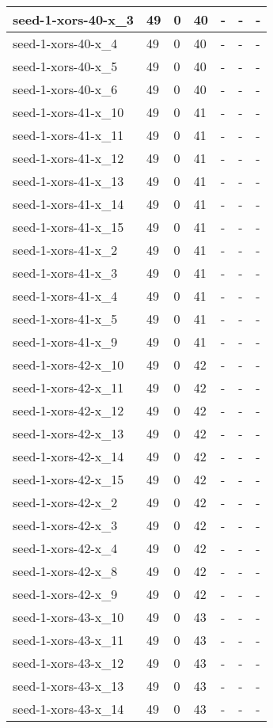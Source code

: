 \begin{scriptsize}
\begin{longtable}{|p{5cm}|l|l|l|l|l|l|}
seed-1-xors-40-x\_3&49&0&40&-&-&- \\ \hline 
seed-1-xors-40-x\_4&49&0&40&-&-&- \\ \hline 
seed-1-xors-40-x\_5&49&0&40&-&-&- \\ \hline 
seed-1-xors-40-x\_6&49&0&40&-&-&- \\ \hline 
seed-1-xors-41-x\_10&49&0&41&-&-&- \\ \hline 
seed-1-xors-41-x\_11&49&0&41&-&-&- \\ \hline 
seed-1-xors-41-x\_12&49&0&41&-&-&- \\ \hline 
seed-1-xors-41-x\_13&49&0&41&-&-&- \\ \hline 
seed-1-xors-41-x\_14&49&0&41&-&-&- \\ \hline 
seed-1-xors-41-x\_15&49&0&41&-&-&- \\ \hline 
seed-1-xors-41-x\_2&49&0&41&-&-&- \\ \hline 
seed-1-xors-41-x\_3&49&0&41&-&-&- \\ \hline 
seed-1-xors-41-x\_4&49&0&41&-&-&- \\ \hline 
seed-1-xors-41-x\_5&49&0&41&-&-&- \\ \hline 
seed-1-xors-41-x\_9&49&0&41&-&-&- \\ \hline 
seed-1-xors-42-x\_10&49&0&42&-&-&- \\ \hline 
seed-1-xors-42-x\_11&49&0&42&-&-&- \\ \hline 
seed-1-xors-42-x\_12&49&0&42&-&-&- \\ \hline 
seed-1-xors-42-x\_13&49&0&42&-&-&- \\ \hline 
seed-1-xors-42-x\_14&49&0&42&-&-&- \\ \hline 
seed-1-xors-42-x\_15&49&0&42&-&-&- \\ \hline 
seed-1-xors-42-x\_2&49&0&42&-&-&- \\ \hline 
seed-1-xors-42-x\_3&49&0&42&-&-&- \\ \hline 
seed-1-xors-42-x\_4&49&0&42&-&-&- \\ \hline 
seed-1-xors-42-x\_8&49&0&42&-&-&- \\ \hline 
seed-1-xors-42-x\_9&49&0&42&-&-&- \\ \hline 
seed-1-xors-43-x\_10&49&0&43&-&-&- \\ \hline 
seed-1-xors-43-x\_11&49&0&43&-&-&- \\ \hline 
seed-1-xors-43-x\_12&49&0&43&-&-&- \\ \hline 
seed-1-xors-43-x\_13&49&0&43&-&-&- \\ \hline 
seed-1-xors-43-x\_14&49&0&43&-&-&- \\ \hline 

\end{longtable}
\end{scriptsize}
